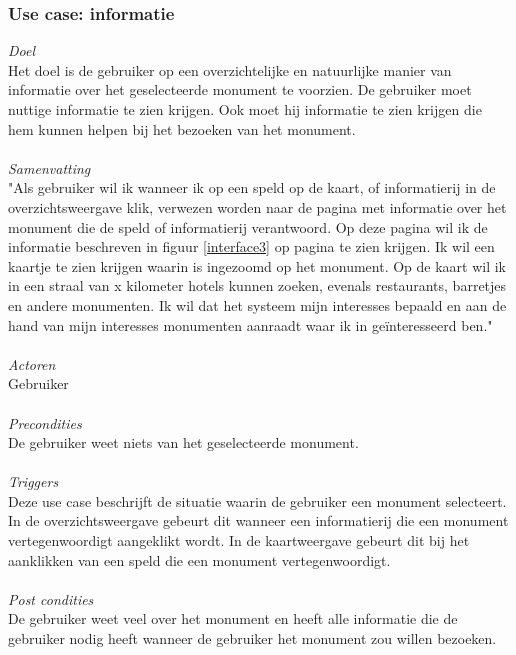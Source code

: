 \documentclass[a4paper,10pt]{article}
\begin{document}
			\subsubsection{Use case: informatie}
			\textit{Doel}\\
			Het doel is de gebruiker op een overzichtelijke en natuurlijke manier van informatie over het geselecteerde monument te voorzien. De gebruiker moet nuttige informatie te zien krijgen. Ook moet hij informatie te zien krijgen die hem kunnen helpen bij het bezoeken van het monument.\\ \\
			\textit{Samenvatting}\\
			"Als gebruiker wil ik wanneer ik op een speld op de kaart, of informatierij in de overzichtsweergave klik, verwezen worden naar de pagina met informatie over het monument die de speld of informatierij verantwoord. Op deze pagina wil ik de informatie beschreven in figuur \ref{interface3} op pagina \pageref{interface3} te zien krijgen. Ik wil een kaartje te zien krijgen waarin is ingezoomd op het monument. Op de kaart wil ik in een straal van x kilometer hotels kunnen zoeken, evenals restaurants, barretjes en andere monumenten. Ik wil dat het systeem mijn interesses bepaald en aan de hand van mijn interesses monumenten aanraadt waar ik in ge\"interesseerd ben."\\ \\
			\textit{Actoren}\\
			Gebruiker\\ \\
			\textit{Precondities}\\
			De gebruiker weet niets van het geselecteerde monument.\\ \\
			\textit{Triggers}\\
			Deze use case beschrijft de situatie waarin de gebruiker een monument selecteert. In de overzichtsweergave gebeurt dit wanneer een informatierij die een monument vertegenwoordigt aangeklikt wordt. In de kaartweergave gebeurt dit bij het aanklikken van een speld die een monument vertegenwoordigt.\\ \\
			\textit{Post condities}\\
			De gebruiker weet veel over het monument en heeft alle informatie die de gebruiker nodig heeft wanneer de gebruiker het monument zou willen bezoeken.	
			
\end{document}
